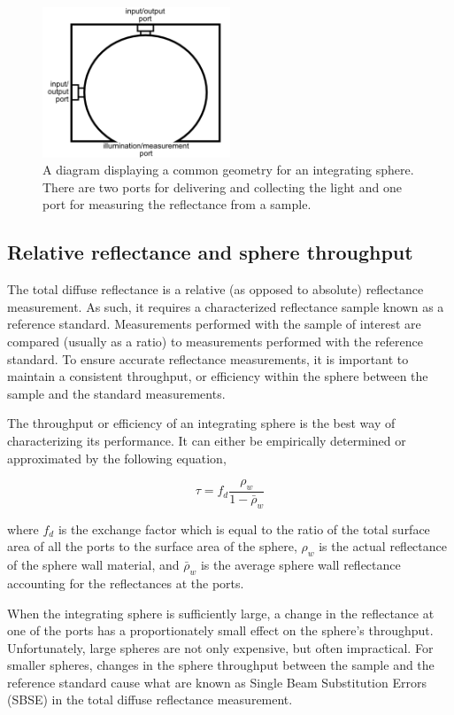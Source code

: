 \begin{figure}
	\centering \includegraphics[width=0.5\textwidth]{figures/intro-is_sample.png}
	\caption[Sample integrating sphere diagram]{\label{fig:intro-is_sample}A diagram displaying a common geometry for an integrating sphere. There are two ports for delivering and collecting the light and one port for measuring the reflectance from a sample.}
\end{figure}

\subsection{Relative reflectance and sphere throughput}
The total diffuse reflectance is a relative (as opposed to absolute) reflectance measurement. As such, it requires a characterized reflectance sample known as a reference standard. Measurements performed with the sample of interest are compared (usually as a ratio) to measurements performed with the reference standard. To ensure accurate reflectance measurements, it is important to maintain a consistent throughput, or efficiency within the sphere between the sample and the standard measurements.\cite{Hanssen2002}

The throughput or efficiency of an integrating sphere is the best way of characterizing its performance. It can either be empirically determined or approximated by the following equation,

\begin{equation}
\tau = f_d \frac{\rho_w}{1-\bar{\rho}_w}
\end{equation}

\noindent where $f_d$ is the exchange factor which is equal to the ratio of the total surface area of all the ports to the surface area of the sphere, $\rho_w$ is the actual reflectance of the sphere wall material, and $\bar{\rho}_w$ is the average sphere wall reflectance accounting for the reflectances at the ports.

When the integrating sphere is sufficiently large, a change in the reflectance at one of the ports has a proportionately small effect on the sphere's throughput. Unfortunately, large spheres are not only expensive, but often impractical. For smaller spheres, changes in the sphere throughput between the sample and the reference standard cause what are known as Single Beam Substitution Errors (SBSE) in the total diffuse reflectance measurement.

